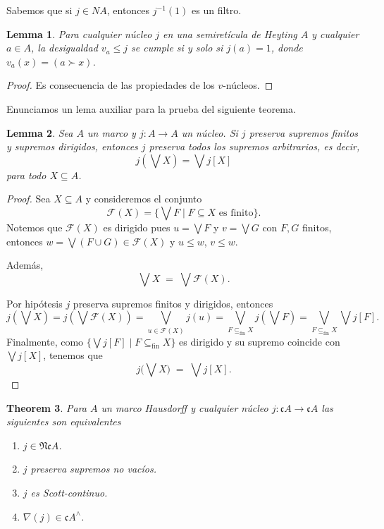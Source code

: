 \documentclass[11pt]{amsart}
\theoremstyle{plain}
\newtheorem{thm}{Theorem}[section]
\newtheorem{lem}[thm]{Lemma}
\theoremstyle{definition}
\begin{document}
Sabemos que si $j\in NA$, entonces $j^{-1}(1)$ es un filtro.

\begin{lem}\label{Lema3.3}
    Para cualquier núcleo $j$ en una semiretícula de Heyting $A$ y cualquier $a\in A$, la desigualdad $v_a\leq j$ se cumple si y solo si $j(a)=1$, donde $v_a(x)=(a\succ x)$.
\end{lem}

\begin{proof}
Es consecuencia de las propiedades de los $v$-núcleos.
\end{proof}

Enunciamos un lema auxiliar para la prueba del siguiente teorema.

\begin{lem}\label{lem:nucleo-dirigidos-a-arbitrarios}
Sea $A$ un marco y $j\colon A\to A$ un núcleo. 
Si $j$ preserva supremos finitos y supremos dirigidos, entonces $j$ preserva todos los supremos arbitrarios, es decir,
\[
j(\bigvee X)=\bigvee j[X]
\]
para todo $X\subseteq A$.
\end{lem}

\begin{proof}
Sea $X\subseteq A$ y consideremos el conjunto
\[
\mathcal{F}(X)=\{\bigvee F\mid F\subseteq X\text{ es finito}\}.
\]
Notemos que $\mathcal{F}(X)$ es dirigido pues $u=\bigvee F$ y $v=\bigvee G$ con $F,G$ finitos, 
entonces $w=\bigvee(F\cup G)\in\mathcal{F}(X)$ y $u\le w$, $v\le w$.

Además, 
\[
\bigvee X\;=\;\bigvee \mathcal{F}(X).
\]

Por hipótesis $j$ preserva supremos finitos y dirigidos, entonces
\[
j(\bigvee X)=j(\bigvee \mathcal{F}(X))=\bigvee_{u\in \mathcal{F}(X)} j(u)=\bigvee_{F\subseteq_{\mathrm{fin}} X} j(\bigvee F)=\bigvee_{F\subseteq_{\mathrm{fin}} X} \bigvee j[F].
\]
Finalmente, como $\{\bigvee j[F]\mid F\subseteq_{\mathrm{fin}} X\}$ es dirigido y su supremo coincide con $\bigvee j[X]$, tenemos que
\[
j\!\Big(\bigvee X\Big)\;=\;\bigvee j[X].
\]
\end{proof}

\begin{thm}\label{Teorema3.4}
    Para $A$ un marco Hausdorff y cualquier núcleo $j\colon \mathfrak{c}A\to \mathfrak{c}A$ las siguientes son equivalentes
    \begin{enumerate}
        \item $j\in \mathfrak{Nc}A$.
        \item $j$ preserva supremos no vacíos.
        \item $j$ es Scott-continuo.
        \item $\nabla(j)\in \mathfrak{c}A^\wedge$.
    \end{enumerate}
\end{thm}
\end{document}
